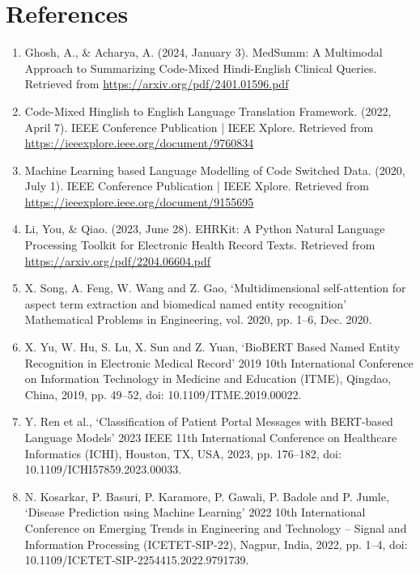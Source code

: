 \documentclass[onecolumn]{article}
\begin{document}
\section{References}
\begin{enumerate}
    \item Ghosh, A., \& Acharya, A. (2024, January 3). MedSumm: A Multimodal Approach to Summarizing Code-Mixed Hindi-English Clinical Queries. Retrieved from \url{https://arxiv.org/pdf/2401.01596.pdf}
    
    \item Code-Mixed Hinglish to English Language Translation Framework. (2022, April 7). IEEE Conference Publication | IEEE Xplore. Retrieved from \url{https://ieeexplore.ieee.org/document/9760834}
    
    \item Machine Learning based Language Modelling of Code Switched Data. (2020, July 1). IEEE Conference Publication | IEEE Xplore. Retrieved from \url{https://ieeexplore.ieee.org/document/9155695}
    
    \item Li, You, \& Qiao. (2023, June 28). EHRKit: A Python Natural Language Processing Toolkit for Electronic Health Record Texts. Retrieved from \url{https://arxiv.org/pdf/2204.06604.pdf}
    
    \item X. Song, A. Feng, W. Wang and Z. Gao, `Multidimensional self-attention for aspect term extraction and biomedical named entity recognition' Mathematical Problems in Engineering, vol. 2020, pp. 1–6, Dec. 2020.
    
    \item X. Yu, W. Hu, S. Lu, X. Sun and Z. Yuan, `BioBERT Based Named Entity Recognition in Electronic Medical Record' 2019 10th International Conference on Information Technology in Medicine and Education (ITME), Qingdao, China, 2019, pp. 49–52, doi: 10.1109/ITME.2019.00022.
    
    \item Y. Ren et al., `Classification of Patient Portal Messages with BERT-based Language Models' 2023 IEEE 11th International Conference on Healthcare Informatics (ICHI), Houston, TX, USA, 2023, pp. 176–182, doi: 10.1109/ICHI57859.2023.00033.
    
    \item N. Kosarkar, P. Basuri, P. Karamore, P. Gawali, P. Badole and P. Jumle, `Disease Prediction using Machine Learning' 2022 10th International Conference on Emerging Trends in Engineering and Technology – Signal and Information Processing (ICETET-SIP-22), Nagpur, India, 2022, pp. 1–4, doi: 10.1109/ICETET-SIP-2254415.2022.9791739.
    

\end{enumerate}
\end{document}
